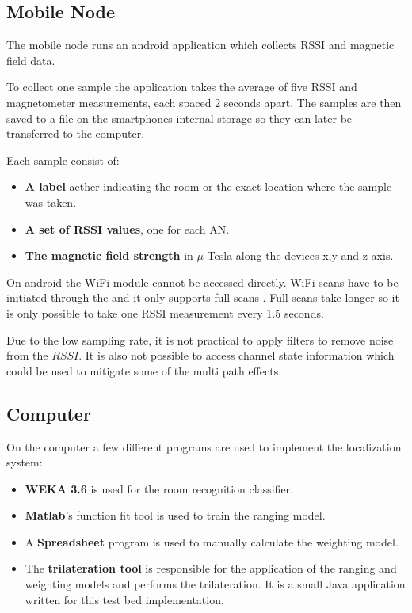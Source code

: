 \subsection{Mobile Node}

The mobile node runs an android application which collects RSSI and magnetic field data.

To collect one sample the application takes the average of five RSSI and magnetometer measurements, each spaced 2 seconds apart. The samples are then saved to a  file on the smartphones internal storage so they can later be transferred to the computer.

Each sample consist of:
\begin{itemize}
\item \textbf{A label} aether indicating the room or the exact location where the sample was taken.
\item \textbf{A set of RSSI values}, one for each AN.
\item \textbf{The magnetic field strength} in \(\mu\)-Tesla along the devices x,y and z axis.
\end{itemize}

On android the WiFi module cannot be accessed directly. WiFi scans have to be initiated through the  and it only supports full scans \cite{brouwers2014incremental}. Full scans take longer so it is only possible to take one RSSI measurement every 1.5 seconds.

Due to the low sampling rate, it is not practical to apply filters to remove noise from the $RSSI$. It is also not possible to access channel state information which could be used to mitigate some of the multi path effects.

\subsection{Computer}

On the computer a few different programs are used to implement the localization system:
\begin{itemize}
\item \textbf{WEKA 3.6} is used for the room recognition classifier.

\item \textbf{Matlab}'s function fit tool is used to train the ranging model.

\item A \textbf{Spreadsheet} program is used to manually calculate the weighting model.


\item The \textbf{trilateration tool} is responsible for the application of the ranging and weighting models and performs the trilateration. It is a small Java application written for this test bed implementation.

\end{itemize}


